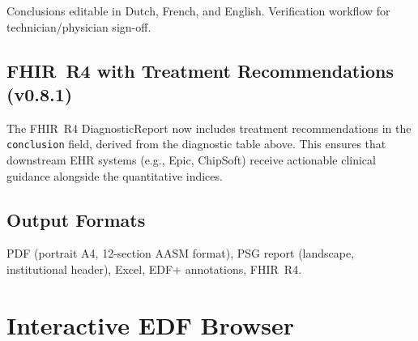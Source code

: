 \documentclass[11pt,a4paper,twocolumn]{article}
\begin{document}
\begin{table}[H]
\centering\small
\caption{Diagnostic conclusions with treatment suggestions}
\end{table}

Conclusions editable in Dutch, French, and English. Verification workflow for technician/physician sign-off.

\subsection{FHIR~R4 with Treatment Recommendations (v0.8.1)}

The FHIR~R4 DiagnosticReport now includes treatment recommendations in the \texttt{conclusion} field, derived from the diagnostic table above. This ensures that downstream EHR systems (e.g., Epic, ChipSoft) receive actionable clinical guidance alongside the quantitative indices.

\subsection{Output Formats}

PDF (portrait A4, 12-section AASM format), PSG report (landscape, institutional header), Excel, EDF+ annotations, FHIR~R4.


\section{Interactive EDF Browser}
\end{document}
